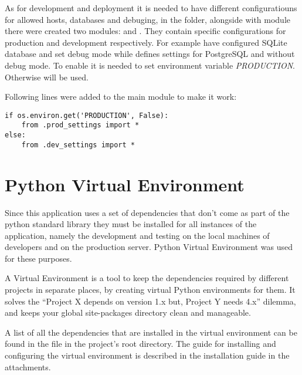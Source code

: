 As for development and deployment it is needed to have different configuratiouns for allowed hosts, databases and
debuging, in the  folder, alongside with  module there were created two modules:
 and . They contain specific configurations for production and development
respectively. For example  have configured SQLite database and set debug mode while
 defines settings for PostgreSQL and without debug mode. To enable  it is
needed to set environment variable \textit{PRODUCTION}. Otherwise  will be used.

Following lines were added to the main  module to make it work:

\begin{lstlisting}
if os.environ.get('PRODUCTION', False):
    from .prod_settings import *
else:
    from .dev_settings import *
\end{lstlisting}



\section{Python Virtual Environment}
Since this application uses a set of dependencies that don’t come as part of the python standard library they must be
installed for all instances of the application, namely the development and testing on the local machines of developers
and on the production server. Python Virtual Environment was used for these purposes.

A Virtual Environment is a tool to keep the dependencies required by different projects in separate places, by
creating virtual Python environments for them. It solves the “Project X depends on version 1.x but, Project Y
needs 4.x” dilemma, and keeps your global site-packages directory clean and manageable.\cite{pythonvenv}

A list of all the dependencies that are installed in the virtual environment can be found in the 
file in the project's root directory. The guide for installing and configuring the virtual environment is described in
the installation guide in the attachments.
